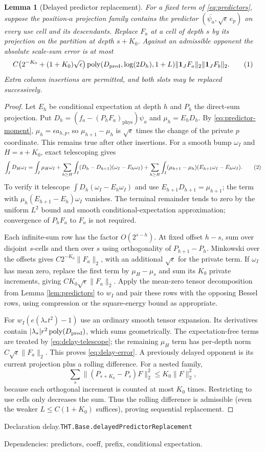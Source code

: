 \documentclass[11pt]{article}
\newtheorem{lemma}[theorem]{Lemma}
\theoremstyle{definition}
\newcommand{\one}{\mathbf 1}
\newcommand{\phys}{\mathrm{phys}}
\newcommand{\poly}{\operatorname{poly}}
\newcommand{\eqtag}[1]{\refstepcounter{equation}\tag{\theequation}\label{#1}}
\numberwithin{equation}{section}
\newcommand{\bp}[3]{\par\smallskip\begingroup\footnotesize
\noindent\hypertarget{bp:#1}{\textsf{Declaration #1.}}\quad\nolinkurl{#2}\par
\noindent\textsf{Dependencies:} #3.\par\endgroup\smallskip}
\begin{document}
\begin{lemma}[Delayed predictor replacement]\label{lem:delay}
For a fixed term of \eqref{eq:predictors}, suppose the position-$a$ projection family contains the predictor $(\overline{\psi_a},\sqrt\epsilon\,e_p)$ on every use cell and its descendants. Replace $F_a$ at a cell of depth $s$ by its projection on the partition at depth $s+K_0$. Against an admissible opponent the absolute scale-sum error is at most
\[
 C\bigl(2^{-K_0}+(1+K_0)\sqrt\epsilon\bigr)
 \poly(D_{\rm pred},\log(2D_h),1+L)\|\one_JF_a\|_2\|\one_JF_b\|_2.
 \eqtag{eq:delay-error}
\]
Extra column insertions are permitted, and both slots may be replaced successively.
\end{lemma}
\begin{proof}
Let $E_h$ be conditional expectation at depth $h$ and $P_h$ the direct-sum projection. Put $D_h=(f_a-(P_hF_a)_{\phys})\psi_a$ and $\mu_h=E_hD_h$. By \eqref{eq:predictor-moment}, $\mu_h=\epsilon a_{h,p}$, so $\mu_{h+1}-\mu_h$ is $\sqrt\epsilon$ times the change of the private $p$ coordinate. This remains true after other insertions. For a smooth bump $\omega_I$ and $H=s+K_0$, exact telescoping gives
\[
 \int_I D_H\omega_I=\int_I\mu_H\omega_I
 +\sum_{h\ge H}\int_I(D_h-D_{h+1})(\omega_I-E_h\omega_I)
 +\sum_{h\ge H}\int_I(\mu_{h+1}-\mu_h)(E_{h+1}\omega_I-E_h\omega_I).
 \eqtag{eq:delay-telescope}
\]
To verify it telescope $\int D_h(\omega_I-E_h\omega_I)$ and use $E_{h+1}D_{h+1}=\mu_{h+1}$; the term with $\mu_h(E_{h+1}-E_h)\omega_I$ vanishes. The terminal remainder tends to zero by the uniform $L^2$ bound and smooth conditional-expectation approximation; convergence of $P_hF_a$ to $F_a$ is not required.

Each infinite-sum row has the factor $O(2^{s-h})$. At fixed offset $h-s$, sum over disjoint $s$-cells and then over $s$ using orthogonality of $P_{h+1}-P_h$. Minkowski over the offsets gives $C2^{-K_0}\|F_a\|_2$, with an additional $\sqrt\epsilon$ for the private term. If $\omega_I$ has mean zero, replace the first term by $\mu_H-\mu_s$ and sum its $K_0$ private increments, giving $CK_0\sqrt\epsilon\|F_a\|_2$. Apply the mean-zero tensor decomposition from Lemma \ref{lem:predictors} to $w_I$ and pair these rows with the opposing Bessel rows, using compression or the square-energy bound as appropriate.

For $w_I(e(\lambda_*t^2)-1)$ use an ordinary smooth tensor expansion. Its derivatives contain $|\lambda_*|r^2\poly(D_{\rm pred})$, which sums geometrically. The expectation-free terms are treated by \eqref{eq:delay-telescope}; the remaining $\mu_H$ term has per-depth norm $C\sqrt\epsilon\|F_a\|_2$. This proves \eqref{eq:delay-error}. A previously delayed opponent is its current projection plus a rolling difference. For a nested family,
\[
 \sum_s\|(P_{s+K_0}-P_s)F\|_2^2\le K_0\|F\|_2^2,
\]
because each orthogonal increment is counted at most $K_0$ times. Restricting to use cells only decreases the sum. Thus the rolling difference is admissible (even the weaker $L\le C(1+K_0)$ suffices), proving sequential replacement.
\end{proof}
\bp{delay}{THT.Base.delayedPredictorReplacement}{predictors, coeff, prefix, conditional expectation}
\end{document}
